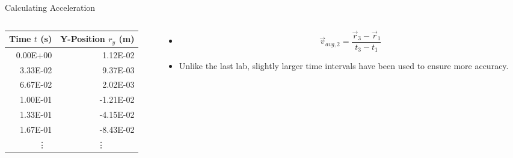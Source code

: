 \begin{frame}{Calculating Acceleration}
\begin{columns}
\begin{column}{0.5\textwidth}
   \begin{center}
   \begin{tabular}{|r|r|}
    \hline
    \textbf{Time} \(t\) (s) & \textbf{Y-Position} \(r_y\) (m) \\
    \hline
    0.00E+00 & 1.12E-02 \\
    \hline
    3.33E-02 & 9.37E-03  \\
    \hline
    6.67E-02 & 2.02E-03  \\
    \hline
    1.00E-01 & -1.21E-02 \\
    \hline
    1.33E-01 & -4.15E-02 \\
    \hline
    1.67E-01 & -8.43E-02 \\
	\hline
	\multicolumn{2}{|c|}{\vdots\ \ \ \ \ \ \ \ \ \ \ \ \vdots} \\
	\hline
   \end{tabular}
   \end{center}
\end{column}
\begin{column}{0.5\textwidth}
	\begin{itemize}
		\item \[\vec{v}_{avg,2} = \frac{\vec{r}_3-\vec{r}_1}
				{t_3-t_1}\]
		\item Unlike the last lab, slightly larger time intervals have been
        used to ensure more accuracy.
	\end{itemize}
\end{column}
\end{columns}
\end{frame}

